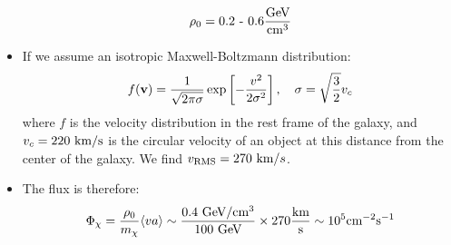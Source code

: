 \begin{itemize}
  \begin{equation}
    \rho_0 = 0.2\text{ - }0.6 \frac{\text{GeV}}{\text{cm}^3}
  \end{equation}
  \item If we assume an isotropic Maxwell-Boltzmann distribution:
  \begin{equation}
    f(\mathbf{v}) = \frac{1}{\sqrt{2\pi\sigma}} \exp \left[-\frac{v^2}{2\sigma^2}\right], \quad \sigma = \sqrt\frac{3}{2} v_c
  \end{equation}
  where $f$ is the velocity distribution in the rest frame of the galaxy, and $v_c = 220~\text{km}/\text{s}$ is the circular velocity of an object at this distance from the center of the galaxy. We find $v_\text{RMS} = 270~\text{km}/s$.
  \item The flux is therefore:
  \begin{equation}
    \Phi_\chi = \frac{\rho_0}{m_\chi} \langle va \rangle \sim \frac{0.4~\text{GeV}/\text{cm}^3}{100~\text{GeV}} \times 270 \frac{\text{km}}{\text{s}} \sim 10^5 \text{cm}^{-2}\text{s}^{-1}
  \end{equation}
\end{itemize}

